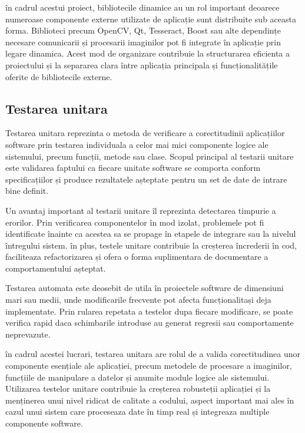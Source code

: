 în cadrul acestui proiect, bibliotecile dinamice au un rol important deoarece numeroase componente externe utilizate de aplicație sunt distribuite sub aceasta forma. Biblioteci precum OpenCV, Qt, Tesseract, Boost sau alte dependințe necesare comunicarii și procesarii imaginilor pot fi integrate în aplicație prin legare dinamica. Acest mod de organizare contribuie la structurarea eficienta a proiectului și la separarea clara între aplicația principala și funcționalitățile oferite de bibliotecile externe.

\subsection*{Testarea unitara}

Testarea unitara reprezinta o metoda de verificare a corectitudinii aplicațiilor software prin testarea individuala a celor mai mici componente logice ale sistemului, precum funcții, metode sau clase. Scopul principal al testarii unitare este validarea faptului ca fiecare unitate software se comporta conform specificațiilor și produce rezultatele așteptate pentru un set de date de intrare bine definit.

Un avantaj important al testarii unitare îl reprezinta detectarea timpurie a erorilor. Prin verificarea componentelor în mod izolat, problemele pot fi identificate înainte ca acestea sa se propage în etapele de integrare sau la nivelul întregului sistem. în plus, testele unitare contribuie la creșterea încrederii în cod, faciliteaza refactorizarea și ofera o forma suplimentara de documentare a comportamentului așteptat.

Testarea automata este deosebit de utila în proiectele software de dimensiuni mari sau medii, unde modificarile frecvente pot afecta funcționalitași deja implementate. Prin rularea repetata a testelor dupa fiecare modificare, se poate verifica rapid daca schimbarile introduse au generat regresii sau comportamente neprevazute.

în cadrul acestei lucrari, testarea unitara are rolul de a valida corectitudinea unor componente esențiale ale aplicației, precum metodele de procesare a imaginilor, funcțiile de manipulare a datelor și anumite module logice ale sistemului. Utilizarea testelor unitare contribuie la creșterea robusteții aplicației și la menținerea unui nivel ridicat de calitate a codului, aspect important mai ales în cazul unui sistem care proceseaza date în timp real și integreaza multiple componente software.

